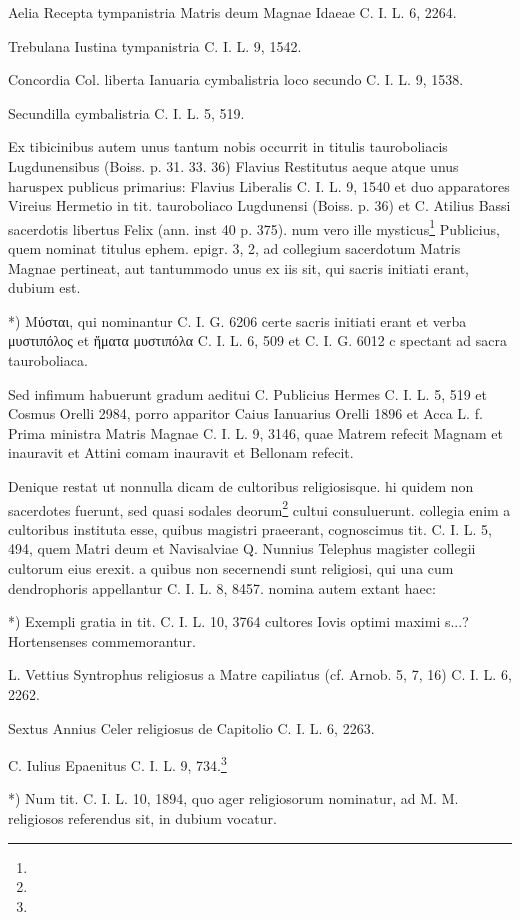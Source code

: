 \documentclass[a4paper, 11pt, oneside, polutonikogreek, german]{article}
\begin{document}
Aelia Recepta tympanistria Matris deum Magnae Idaeae C. I. L. 6, 2264.

Trebulana Iustina tympanistria C. I. L. 9, 1542.

Concordia Col. liberta Ianuaria cymbalistria loco secundo C. I. L. 9, 1538.

Secundilla cymbalistria C. I. L. 5, 519.

Ex tibicinibus autem unus tantum nobis occurrit in titulis tauroboliacis Lugdunensibus (Boiss. p. 31. 33. 36) Flavius Restitutus aeque atque unus haruspex publicus primarius: Flavius Liberalis C. I. L. 9, 1540 et duo apparatores Vireius Hermetio in tit. tauroboliaco Lugdunensi (Boiss. p. 36) et C. Atilius Bassi sacerdotis libertus Felix (ann. inst 40 p. 375). num vero ille mysticus\footnote{} Publicius, quem nominat titulus ephem. epigr. 3, 2, ad collegium sacerdotum Matris Magnae pertineat, aut tantummodo unus ex iis sit, qui sacris initiati erant, dubium est.

*) Μύσται, qui nominantur C. I. G. 6206 certe sacris initiati erant et verba μυστιπόλος et ἤματα μυστιπόλα C. I. L. 6, 509 et C. I. G. 6012 c spectant ad sacra tauroboliaca.

Sed infimum habuerunt gradum aeditui C. Publicius Hermes C. I. L. 5, 519 et Cosmus Orelli 2984, porro apparitor Caius Ianuarius Orelli 1896 et Acca L. f. Prima ministra Matris Magnae C. I. L. 9, 3146, quae Matrem refecit Magnam et inauravit et Attini comam inauravit et Bellonam refecit.

Denique restat ut nonnulla dicam de cultoribus religiosisque. hi quidem non sacerdotes fuerunt, sed quasi sodales deorum\footnote{} cultui consuluerunt. collegia enim a cultoribus instituta esse, quibus magistri praeerant, cognoscimus tit. C. I. L. 5, 494, quem Matri deum et Navisalviae Q. Nunnius Telephus magister collegii cultorum eius erexit. a quibus non secernendi sunt religiosi, qui una cum dendrophoris appellantur C. I. L. 8, 8457. nomina autem extant haec:

*) Exempli gratia in tit. C. I. L. 10, 3764 cultores Iovis optimi maximi s...? Hortensenses commemorantur.

L. Vettius Syntrophus religiosus a Matre capiliatus (cf. Arnob. 5, 7, 16) C. I. L. 6, 2262.

Sextus Annius Celer religiosus de Capitolio C. I. L. 6, 2263.

C. Iulius Epaenitus C. I. L. 9, 734.\footnote{}

*) Num tit. C. I. L. 10, 1894, quo ager religiosorum nominatur, ad M. M. religiosos referendus sit, in dubium vocatur.
\end{document}
